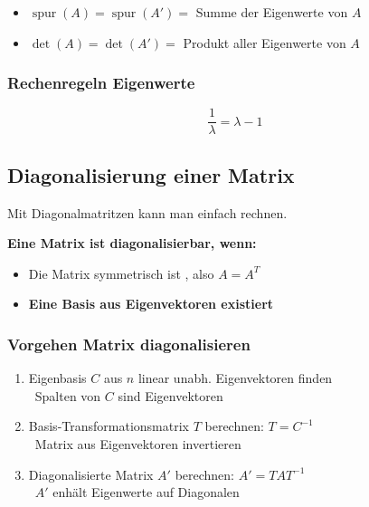 \begin{itemize}
	\item $\operatorname{spur}(A) = \operatorname{spur}(A') =$ Summe der Eigenwerte von $A$ 
	\item $\det(A) = \det(A') =$ Produkt aller Eigenwerte von $A$
\end{itemize}


\subsubsection{Rechenregeln Eigenwerte}

\vspace{-0.2cm}
$$ \frac{1}{\lambda} = \lambda - 1 $$	
			   

\subsection{Diagonalisierung einer Matrix}
		
Mit Diagonalmatritzen kann man einfach rechnen.

\textbf{Eine Matrix ist diagonalisierbar, wenn:} 
\vspace{0.1cm}
\begin{itemize}
	\item Die Matrix symmetrisch ist , also $A = A^T$
	\item \textbf{Eine Basis aus Eigenvektoren existiert}
\end{itemize}
			
		
\subsubsection{Vorgehen Matrix diagonalisieren} 

\begin{enumerate}
	\item Eigenbasis $C$ aus $n$ linear unabh. Eigenvektoren finden \\
		\textrightarrow\ Spalten von $C$ sind Eigenvektoren
	\item Basis-Transformationsmatrix $T$ berechnen: $T = C^{-1}$ \\
		\textrightarrow\ Matrix aus Eigenvektoren invertieren
	\item Diagonalisierte Matrix $A'$ berechnen: $A' = T A T^{-1}$ \\
		\textrightarrow\ $A'$ enhält Eigenwerte auf Diagonalen
\end{enumerate}


